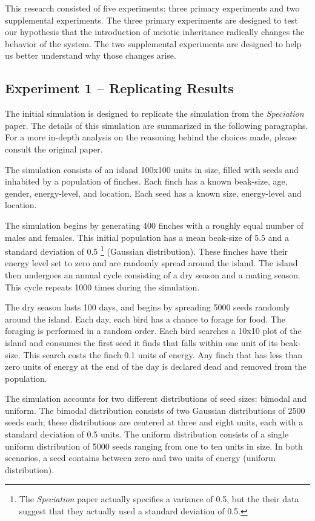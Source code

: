 \documentclass{article}
\begin{document}
This research consisted of five experiments: three primary experiments and two supplemental experiments. The three primary experiments are designed to test our hypothesis that the introduction of meiotic inheritance radically changes the behavior of the system. The two supplemental experiments are designed to help us better understand why those changes arise. 



\subsection{Experiment 1 -- Replicating Results}

The initial simulation is designed to replicate the simulation from the \textit{Speciation} paper. The details of this simulation are summarized in the following paragraphs. For a more in-depth analysis on the reasoning behind the choices made, please consult the original paper. 

The simulation consists of an island 100x100 units in size, filled with seeds and inhabited by a population of finches. Each finch has a known beak-size, age, gender, energy-level, and location. Each seed has a known size, energy-level and location.

The simulation begins by generating 400 finches with a roughly equal number of males and females. This initial population has a mean beak-size of  5.5 and a standard deviation of 0.5 \footnote{The \textit{Speciation} paper actually specifies a variance of 0.5, but the their data suggest that they actually used a standard deviation of 0.5.} (Gaussian distribution). These finches have their energy level set to zero and are randomly spread around the island. The island then undergoes an annual cycle consisting of a dry season and a mating season. This cycle repeats 1000 times during the simulation. 

The dry season lasts 100 days, and begins by spreading 5000 seeds randomly around the island. Each day, each bird has a chance to forage for food. The foraging is performed in a random order. Each bird searches a 10x10 plot of the island and consumes the first seed it finds that falls within one unit of its beak-size. This search costs the finch 0.1 units of energy. Any finch that has less than zero units of energy at the end of the day is declared dead and removed from the population.

The simulation accounts for two different distributions of seed sizes: bimodal and uniform. The bimodal distribution consists of two Gaussian distributions of 2500 seeds each; these distributions are centered at three and eight units, each with a standard deviation of 0.5 units. The uniform distribution consists of a single uniform distribution of 5000 seeds ranging from one to ten units in size. In both scenarios, a seed contains between zero and two units of energy (uniform distribution).
\end{document}
